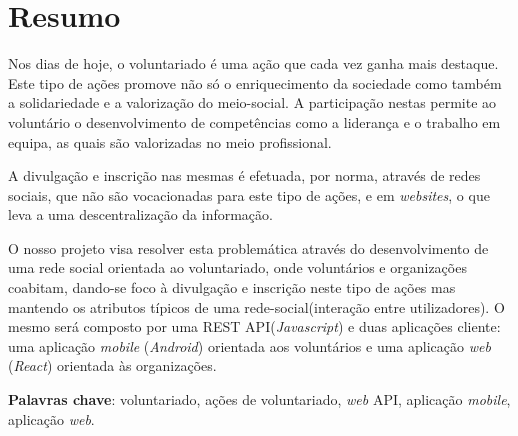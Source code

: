 \section{Resumo}
Nos dias de hoje, o voluntariado é uma ação que cada vez ganha mais destaque. Este tipo de ações promove não só o enriquecimento da sociedade como também a solidariedade e a valorização do meio-social. A participação nestas permite ao voluntário o desenvolvimento de competências como a liderança e o trabalho em equipa, as quais são valorizadas no meio profissional. \par \smallskip
A divulgação e inscrição nas mesmas é efetuada, por norma, através de redes sociais, que não são vocacionadas para este tipo de ações, e em \textit{websites}, o que leva a uma descentralização da informação. \par \smallskip
O nosso projeto visa resolver esta problemática através do desenvolvimento de uma rede social orientada ao voluntariado, onde voluntários e organizações coabitam, dando-se foco à divulgação e inscrição neste tipo de ações mas mantendo os atributos típicos de uma rede-social(interação entre utilizadores). O mesmo será composto por uma REST API(\textit{Javascript}) e duas aplicações cliente: uma aplicação \textit{mobile} (\textit{Android}) orientada aos voluntários e uma aplicação \textit{web} (\textit{React}) orientada às organizações. \par \smallskip
\textbf{Palavras chave}: voluntariado, ações de voluntariado, \textit{web} API, aplicação \textit{mobile}, aplicação \textit{web}.